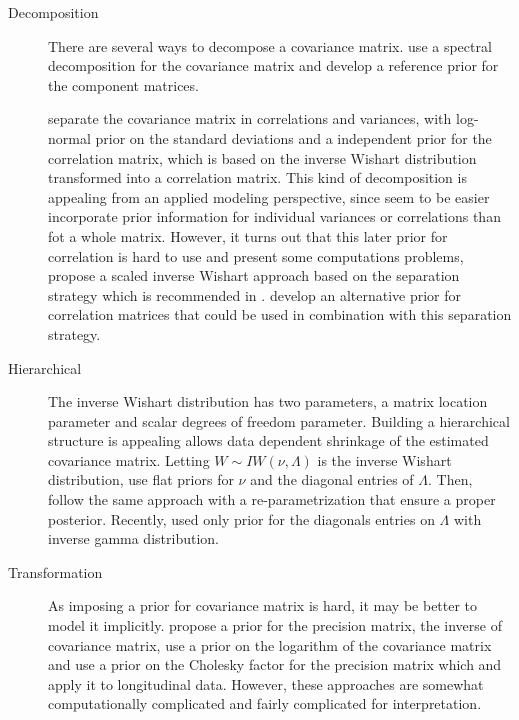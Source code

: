 \documentclass{article}
\begin{document}
\begin{description}
\item[Decomposition] There are several ways to decompose a covariance matrix.  \cite{yang1994} use a spectral decomposition for the covariance matrix and develop a reference prior for the component matrices. 

\cite{barnard2000} separate the covariance matrix in correlations and variances, with log-normal prior on the standard deviations and a independent prior for the correlation matrix, which is based on the inverse Wishart distribution transformed into a correlation matrix. This kind of decomposition is appealing from an applied modeling perspective, since seem to be easier incorporate prior information for individual variances or correlations than fot a whole matrix. However, it turns out that this later prior for correlation is hard to use and present some computations problems, \cite{SIW2008} propose a scaled inverse Wishart approach based on the separation strategy which is recommended in \cite{gelmanhill}. \cite{lewandowski2009generating} develop an alternative prior for correlation matrices that could be used in combination with this separation strategy. 

\item[Hierarchical] The inverse Wishart distribution has two parameters, a matrix location parameter and scalar degrees of freedom parameter.  Building a hierarchical structure is appealing allows data dependent shrinkage of the estimated covariance matrix. Letting $W \sim IW(\nu,\Lambda)$ is the inverse Wishart distribution, \cite{daniels1999} use flat priors for $\nu$ and the diagonal entries of $\Lambda$. Then, \cite{matilde} follow the same approach with a re-parametrization that ensure a proper posterior.  Recently,  \cite{huang2013simple} used only prior for the diagonals entries on $\Lambda$ with inverse gamma distribution. 

\item[Transformation] As imposing a prior for covariance matrix is hard, it may be better to model it implicitly. \cite{wong2003} propose a prior for the precision matrix, the inverse of covariance matrix, \cite{leonard1992} use a prior on the logarithm of the covariance matrix and \cite{smith2002} use a prior on the Cholesky factor for the precision matrix which and apply it to longitudinal data.
However, these approaches are somewhat computationally complicated and fairly complicated for interpretation. 
\end{description}
\end{document}
